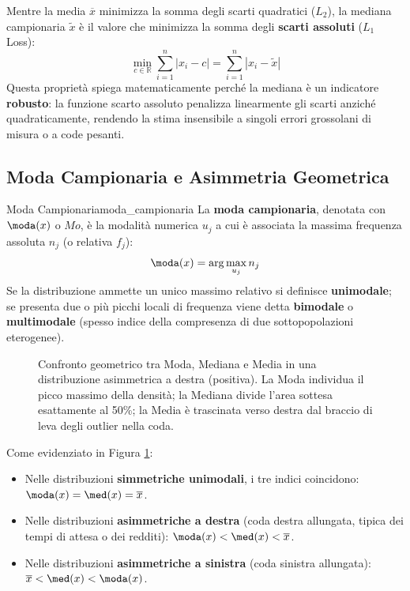 \begin{osservazione}
Mentre la media $\overline{x}$ minimizza la somma degli scarti quadratici ($L_2$), la mediana campionaria $\widetilde{x}$ è il valore che minimizza la somma degli \textbf{scarti assoluti} ($L_1$ Loss):
\begin{equation}
\min_{c \in \mathbb{R}} \sum_{i=1}^n |x_i - c| = \sum_{i=1}^n |x_i - \widetilde{x}|
\end{equation}
Questa proprietà spiega matematicamente perché la mediana è un indicatore \textbf{robusto}: la funzione scarto assoluto penalizza linearmente gli scarti anziché quadraticamente, rendendo la stima insensibile a singoli errori grossolani di misura o a code pesanti.
\end{osservazione}

\subsection{Moda Campionaria e Asimmetria Geometrica}

\begin{definizione}{Moda Campionaria}{moda_campionaria}
La \textbf{moda campionaria}, denotata con $\moda(x)$ o $Mo$, è la modalità numerica $u_j$ a cui è associata la massima frequenza assoluta $n_j$ (o relativa $f_j$):
\begin{equation}
\moda(x) = \arg\max_{u_j} n_j
\end{equation}
Se la distribuzione ammette un unico massimo relativo si definisce \textbf{unimodale}; se presenta due o più picchi locali di frequenza viene detta \textbf{bimodale} o \textbf{multimodale} (spesso indice della compresenza di due sottopopolazioni eterogenee).
\end{definizione}

\begin{figure}[htbp]
\centering

\caption{Confronto geometrico tra Moda, Mediana e Media in una distribuzione asimmetrica a destra (positiva). La Moda individua il picco massimo della densità; la Mediana divide l'area sottesa esattamente al 50\%; la Media è trascinata verso destra dal braccio di leva degli outlier nella coda.}
\label{fig:istogramma_asimmetria}
\end{figure}

Come evidenziato in Figura \ref{fig:istogramma_asimmetria}:
\begin{itemize}
    \item Nelle distribuzioni \textbf{simmetriche unimodali}, i tre indici coincidono: $\moda(x) = \med(x) = \overline{x}$.
    \item Nelle distribuzioni \textbf{asimmetriche a destra} (coda destra allungata, tipica dei tempi di attesa o dei redditi): $\moda(x) < \med(x) < \overline{x}$.
    \item Nelle distribuzioni \textbf{asimmetriche a sinistra} (coda sinistra allungata): $\overline{x} < \med(x) < \moda(x)$.
\end{itemize}

